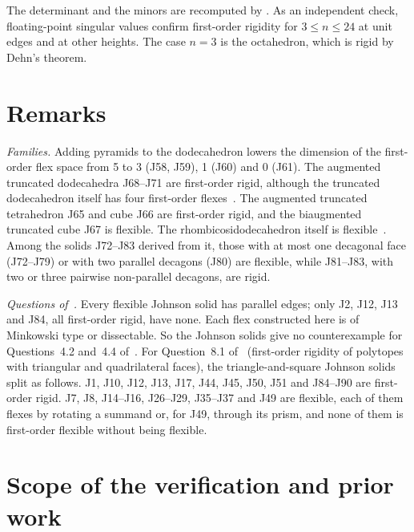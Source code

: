 \documentclass[11pt]{amsart}
\theoremstyle{remark}
\begin{document}
The determinant and the minors are recomputed by . As an independent check, floating-point singular values confirm first-order rigidity for $3\le n\le24$ at unit edges and at other heights. The case $n=3$ is the octahedron, which is rigid by Dehn's theorem.

\section{Remarks}

\emph{Families.} Adding pyramids to the dodecahedron lowers the dimension of the first-order flex space from 5 to 3 (J58, J59), 1 (J60) and 0 (J61). The augmented truncated dodecahedra J68--J71 are first-order rigid, although the truncated dodecahedron itself has four first-order flexes~\cite{AHWZ2026}. The augmented truncated tetrahedron J65 and cube J66 are first-order rigid, and the biaugmented truncated cube J67 is flexible. The rhombicosidodecahedron itself is flexible~\cite{AHWZ2026}. Among the solids J72--J83 derived from it, those with at most one decagonal face (J72--J79) or with two parallel decagons (J80) are flexible, while J81--J83, with two or three pairwise non-parallel decagons, are rigid.

\emph{Questions of~\cite{HSW2026,AHWZ2026}.} Every flexible Johnson solid has parallel edges; only J2, J12, J13 and J84, all first-order rigid, have none. Each flex constructed here is of Minkowski type or dissectable. So the Johnson solids give no counterexample for Questions~4.2 and~4.4 of~\cite{HSW2026}. For Question~8.1 of~\cite{AHWZ2026} (first-order rigidity of polytopes with triangular and quadrilateral faces), the triangle-and-square Johnson solids split as follows. J1, J10, J12, J13, J17, J44, J45, J50, J51 and J84--J90 are first-order rigid. J7, J8, J14--J16, J26--J29, J35--J37 and J49 are flexible, each of them flexes by rotating a summand or, for J49, through its prism, and none of them is first-order flexible without being flexible.

\section{Scope of the verification and prior work}\label{sec:scope}
\end{document}
